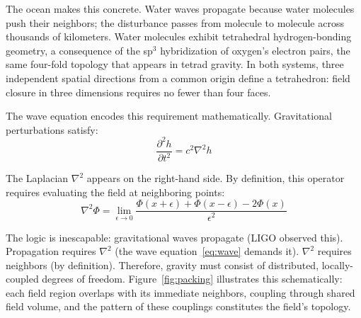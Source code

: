 \documentclass[aps,prd,preprint,superscriptaddress,showpacs,preprintnumbers,amsmath,amssymb,nofootinbib]{revtex4-2}
\begin{document}
The ocean makes this concrete. Water waves propagate because water molecules push their neighbors; the disturbance passes from molecule to molecule across thousands of kilometers. Water molecules exhibit tetrahedral hydrogen-bonding geometry, a consequence of the sp${}^3$ hybridization of oxygen's electron pairs, the same four-fold topology that appears in tetrad gravity. In both systems, three independent spatial directions from a common origin define a tetrahedron: field closure in three dimensions requires no fewer than four faces.

The wave equation encodes this requirement mathematically. Gravitational perturbations satisfy:
\begin{equation}
\frac{\partial^2 h}{\partial t^2} = c^2 \nabla^2 h
\label{eq:wave}
\end{equation}

The Laplacian $\nabla^2$ appears on the right-hand side. By definition, this operator requires evaluating the field at neighboring points:
\begin{equation}
\nabla^2 \Phi = \lim_{\epsilon \to 0} \frac{\Phi(x+\epsilon) + \Phi(x-\epsilon) - 2\Phi(x)}{\epsilon^2}
\label{eq:laplacian}
\end{equation}

The logic is inescapable: gravitational waves propagate (LIGO observed this). Propagation requires $\nabla^2$ (the wave equation~\eqref{eq:wave} demands it). $\nabla^2$ requires neighbors (by definition). Therefore, gravity must consist of distributed, locally-coupled degrees of freedom. Figure~\ref{fig:packing} illustrates this schematically: each field region overlaps with its immediate neighbors, coupling through shared field volume, and the pattern of these couplings constitutes the field's topology.
\end{document}

